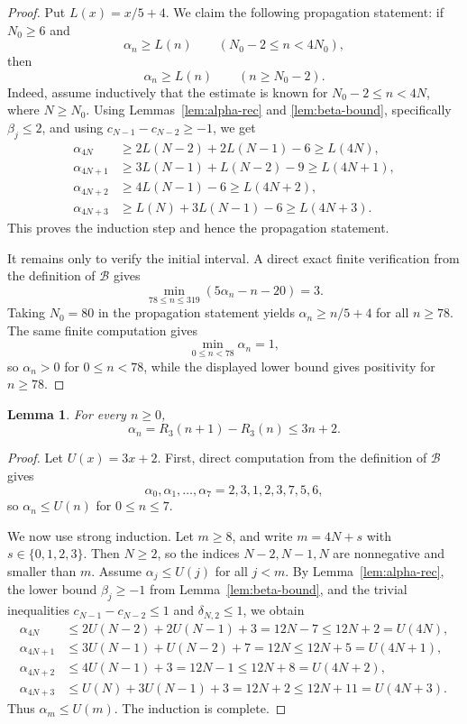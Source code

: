 \documentclass[11pt]{amsart}
\newtheorem{lemma}[theorem]{Lemma}
\theoremstyle{remark}
\theoremstyle{plain}
\newcommand{\BaseB}{\mathcal B}
\begin{document}
\begin{proof}
Put $L(x)=x/5+4$. We claim the following propagation statement: if $N_0\ge 6$ and
\[
\alpha_n\ge L(n)\qquad (N_0-2\le n<4N_0),
\]
then
\[
\alpha_n\ge L(n)\qquad (n\ge N_0-2).
\]
Indeed, assume inductively that the estimate is known for $N_0-2\le n<4N$, where $N\ge N_0$. Using Lemmas~\ref{lem:alpha-rec} and \ref{lem:beta-bound}, specifically $\beta_j\le 2$, and using $c_{N-1}-c_{N-2}\ge -1$, we get
\[
\begin{aligned}
\alpha_{4N}&\ge 2L(N-2)+2L(N-1)-6\ge L(4N),\\
\alpha_{4N+1}&\ge 3L(N-1)+L(N-2)-9\ge L(4N+1),\\
\alpha_{4N+2}&\ge 4L(N-1)-6\ge L(4N+2),\\
\alpha_{4N+3}&\ge L(N)+3L(N-1)-6\ge L(4N+3).
\end{aligned}
\]
This proves the induction step and hence the propagation statement.

It remains only to verify the initial interval. A direct exact finite verification from the definition of $\BaseB$ gives
\[
\min_{78\le n\le 319}(5\alpha_n-n-20)=3.
\]
Taking $N_0=80$ in the propagation statement yields $\alpha_n\ge n/5+4$ for all $n\ge 78$. The same finite computation gives
\[
\min_{0\le n<78}\alpha_n=1,
\]
so $\alpha_n>0$ for $0\le n<78$, while the displayed lower bound gives positivity for $n\ge 78$.
\end{proof}

\begin{lemma}\label{lem:alpha-upper}
For every $n\ge 0$,
\[
\alpha_n=R_3(n+1)-R_3(n)\le 3n+2.
\]
\end{lemma}

\begin{proof}
Let $U(x)=3x+2$. First, direct computation from the definition of $\BaseB$ gives
\[
\alpha_0,\alpha_1,\ldots,\alpha_7=2,3,1,2,3,7,5,6,
\]
so $\alpha_n\le U(n)$ for $0\le n\le 7$.

We now use strong induction. Let $m\ge 8$, and write $m=4N+s$ with $s\in\{0,1,2,3\}$. Then $N\ge 2$, so the indices $N-2,N-1,N$ are nonnegative and smaller than $m$. Assume $\alpha_j\le U(j)$ for all $j<m$. By Lemma~\ref{lem:alpha-rec}, the lower bound $\beta_j\ge -1$ from Lemma~\ref{lem:beta-bound}, and the trivial inequalities $c_{N-1}-c_{N-2}\le 1$ and $\delta_{N,2}\le 1$, we obtain
\[
\begin{aligned}
\alpha_{4N}&\le 2U(N-2)+2U(N-1)+3=12N-7\le 12N+2=U(4N),\\
\alpha_{4N+1}&\le 3U(N-1)+U(N-2)+7=12N\le 12N+5=U(4N+1),\\
\alpha_{4N+2}&\le 4U(N-1)+3=12N-1\le 12N+8=U(4N+2),\\
\alpha_{4N+3}&\le U(N)+3U(N-1)+3=12N+2\le 12N+11=U(4N+3).
\end{aligned}
\]
Thus $\alpha_m\le U(m)$. The induction is complete.
\end{proof}
\end{document}

